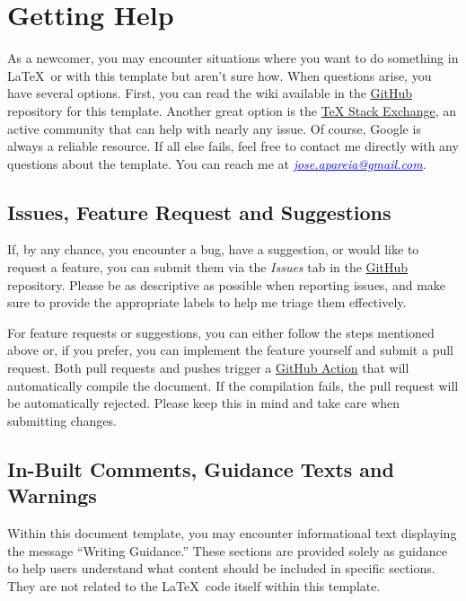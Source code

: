 \section{Getting Help}
As a newcomer, you may encounter situations where you want to do something in \LaTeX~or with this template but aren't sure how. When questions arise, you have several options. First, you can read the wiki available in the \href{https://github.com/joseareia/ipleiria-thesis}{GitHub} repository for this template. Another great option is the \href{https://tex.stackexchange.com/}{TeX Stack Exchange}, an active community that can help with nearly any issue. Of course, Google is always a reliable resource. If all else fails, feel free to contact me directly with any questions about the template. You can reach me at \textit{\textcolor{blue}{\ul{jose.apareia@gmail.com}}}.

\subsection{Issues, Feature Request and Suggestions}
If, by any chance, you encounter a bug, have a suggestion, or would like to request a feature, you can submit them via the \textit{Issues} tab in the \href{https://github.com/joseareia/ipleiria-thesis}{GitHub} repository. Please be as descriptive as possible when reporting issues, and make sure to provide the appropriate labels to help me triage them effectively.

For feature requests or suggestions, you can either follow the steps mentioned above or, if you prefer, you can implement the feature yourself and submit a pull request. Both pull requests and pushes trigger a \href{https://github.com/joseareia/ipleiria-thesis/actions/workflows/latex.yml}{GitHub Action} that will automatically compile the document. If the compilation fails, the pull request will be automatically rejected. Please keep this in mind and take care when submitting changes.

\subsection{In-Built Comments, Guidance Texts and Warnings}
Within this document template, you may encounter informational text displaying the message ``Writing Guidance.'' These sections are provided solely as guidance to help users understand what content should be included in specific sections. They are not related to the \LaTeX~code itself within this template.

